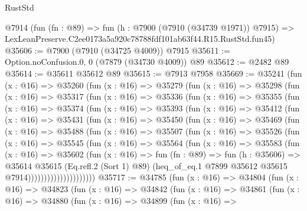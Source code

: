 \begin{lexlean}{RustStd}
\begin{coremodule}
    @7914
    (fun (fn : @89) =>
    fun (h : @7900 (@7910 (@34739 @1971)) @7915) =>
    LexLeanPreserve.C2ee0173a5a920c78788fdf101ab63f44.R15.RustStd.fun45)
@35606 := @7900 (@7910 (@34725 @4009)) @7915
@35611 := Option.noConfusion.{0, 0} (@7879 (@34730 @4009)) @89
@35612 := @2482 @89
@35614 := @35611 @35612 @89
@35615 := @7913 @7958
@35669 := @35241
    (fun (x : @16) =>
    @35260
      (fun (x : @16) =>
      @35279
        (fun (x : @16) =>
        @35298
          (fun (x : @16) =>
          @35317
            (fun (x : @16) =>
            @35336
              (fun (x : @16) =>
              @35355
                (fun (x : @16) =>
                @35374
                  (fun (x : @16) =>
                  @35393
                    (fun (x : @16) =>
                    @35412
                      (fun (x : @16) =>
                      @35431
                        (fun (x : @16) =>
                        @35450
                          (fun (x : @16) =>
                          @35469
                            (fun (x : @16) =>
                            @35488
                              (fun (x : @16) =>
                              @35507
                                (fun (x : @16) =>
                                @35526
                                  (fun (x : @16) =>
                                  @35545
                                    (fun (x : @16) =>
                                    @35564
                                      (fun (x : @16) =>
                                      @35583
                                        (fun (x : @16) =>
                                        @35602
                                          (fun (x : @16) =>
                                          fun (fn : @89) =>
                                          fun (h : @35606) =>
                                          @35614
                                            @35615
                                            (Eq.refl.{2} (Sort 1) @89)
                                            (heq_of_eq.{1}
                                              @7899
                                              @35612
                                              @35615
                                              @7914)))))))))))))))))))))
@35717 := @34785
    (fun (x : @16) =>
    @34804
      (fun (x : @16) =>
      @34823
        (fun (x : @16) =>
        @34842
          (fun (x : @16) =>
          @34861
            (fun (x : @16) =>
            @34880
              (fun (x : @16) =>
              @34899
                (fun (x : @16) =>

\end{coremodule}
\end{lexlean}
